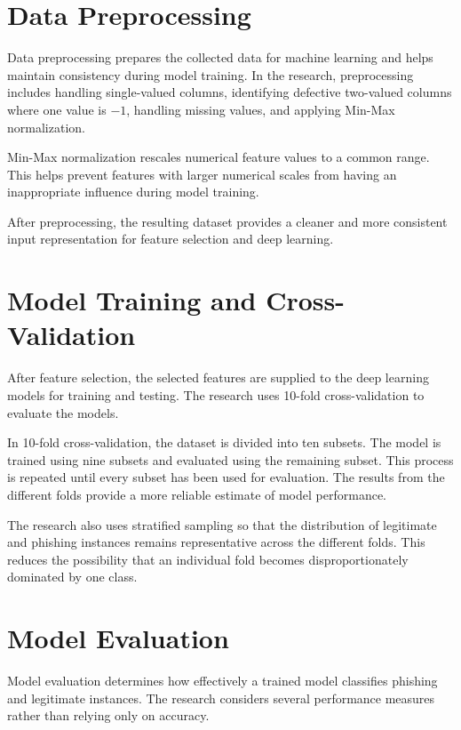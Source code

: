 \documentclass[12pt,a4paper]{report}
\begin{document}
\section{Data Preprocessing}

Data preprocessing prepares the collected data for machine learning
and helps maintain consistency during model training. In the
research, preprocessing includes handling single-valued columns,
identifying defective two-valued columns where one value is $-1$,
handling missing values, and applying Min-Max normalization.

Min-Max normalization rescales numerical feature values to a common
range. This helps prevent features with larger numerical scales from
having an inappropriate influence during model training.

After preprocessing, the resulting dataset provides a cleaner and
more consistent input representation for feature selection and
deep learning.

\section{Model Training and Cross-Validation}

After feature selection, the selected features are supplied to the
deep learning models for training and testing. The research uses
10-fold cross-validation to evaluate the models.

In 10-fold cross-validation, the dataset is divided into ten
subsets. The model is trained using nine subsets and evaluated using
the remaining subset. This process is repeated until every subset
has been used for evaluation. The results from the different folds
provide a more reliable estimate of model performance.

The research also uses stratified sampling so that the distribution
of legitimate and phishing instances remains representative across
the different folds. This reduces the possibility that an individual
fold becomes disproportionately dominated by one class.

\section{Model Evaluation}

Model evaluation determines how effectively a trained model
classifies phishing and legitimate instances. The research considers
several performance measures rather than relying only on accuracy.
\end{document}
